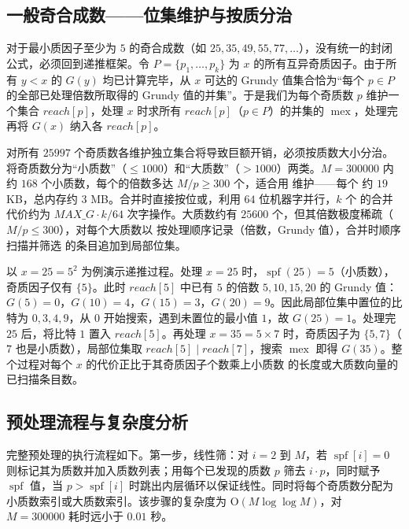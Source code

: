 \subsection{一般奇合成数——位集维护与按质分治}

对于最小质因子至少为 $5$ 的奇合成数（如 $25, 35, 49, 55, 77, \dots$），没有统一的封闭公式，必须回到递推框架。令 $P = \{p_1, \dots, p_k\}$ 为 $x$ 的所有互异奇质因子。由于所有 $y < x$ 的 $G(y)$ 均已计算完毕，从 $x$ 可达的 Grundy 值集合恰为“每个 $p \in P$ 的全部已处理倍数所取得的 Grundy 值的并集”。于是我们为每个奇质数 $p$ 维护一个集合 $\mathit{reach}[p]$，处理 $x$ 时求所有 $\mathit{reach}[p]$（$p \in P$）的并集的 $\operatorname{mex}$，处理完再将 $G(x)$ 纳入各 $\mathit{reach}[p]$。

对所有 $25997$ 个奇质数各维护独立集合将导致巨额开销，必须按质数大小分治。将奇质数分为“小质数”（$\le 1000$）和“大质数”（$> 1000$）两类。$M = 300000$ 内约 $168$ 个小质数，每个的倍数多达 $M/p \ge 300$ 个，适合用  维护——每个  约 $19$ KB，总内存约 $3$ MB。合并时直接按位或，利用 $64$ 位机器字并行，$k$ 个  的合并代价约为 $\mathit{MAX\_G} \cdot k / 64$ 次字操作。大质数约有 $25600$ 个，但其倍数极度稀疏（$M/p \le 300$），对每个大质数以  按处理顺序记录（倍数，Grundy 值），合并时顺序扫描并筛选  的条目追加到局部位集。

以 $x = 25 = 5^2$ 为例演示递推过程。处理 $x = 25$ 时，$\operatorname{spf}(25) = 5$（小质数），奇质因子仅有 $\{5\}$。此时 $\mathit{reach}[5]$ 中已有 $5$ 的倍数 $5, 10, 15, 20$ 的 Grundy 值：$G(5)=0$，$G(10)=4$，$G(15)=3$，$G(20)=9$。因此局部位集中置位的比特为 $0, 3, 4, 9$，从 $0$ 开始搜索，遇到未置位的最小值 $1$，故 $G(25) = 1$。处理完 $25$ 后，将比特 $1$ 置入 $\mathit{reach}[5]$。再处理 $x = 35 = 5 \times 7$ 时，奇质因子为 $\{5, 7\}$（$7$ 也是小质数），局部位集取 $\mathit{reach}[5] \mid \mathit{reach}[7]$，搜索 $\operatorname{mex}$ 即得 $G(35)$。整个过程对每个 $x$ 的代价正比于其奇质因子个数乘上小质数  的长度或大质数向量的已扫描条目数。

\subsection{预处理流程与复杂度分析}

完整预处理的执行流程如下。第一步，线性筛：对 $i = 2$ 到 $M$，若 $\operatorname{spf}[i] = 0$ 则标记其为质数并加入质数列表；用每个已发现的质数 $p$ 筛去 $i \cdot p$，同时赋予 $\operatorname{spf}$ 值，当 $p > \operatorname{spf}[i]$ 时跳出内层循环以保证线性。同时将每个奇质数分配为小质数索引或大质数索引。该步骤的复杂度为 $\mathrm{O}(M \log \log M)$，对 $M = 300000$ 耗时远小于 $0.01$ 秒。

